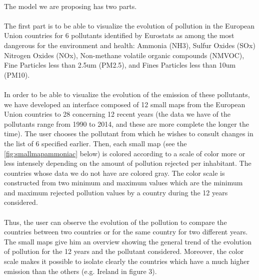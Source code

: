 \documentclass[preprint,journal]{vgtc}       %
\begin{document}
\paragraph{}
The model we are proposing has two parts.

\paragraph{}
The first part is to be able to visualize the evolution of pollution in the European Union countries for 6 pollutants identified by Eurostats as among the most dangerous for the environment and health: Ammonia (NH3), Sulfur Oxides (SOx) Nitrogen Oxides (NOx), Non-methane volatile organic compounds (NMVOC), Fine Particles less than 2.5um (PM2.5), and Fines Particles less than 10um (PM10).

\paragraph{}
In order to be able to visualize the evolution of the emission of these pollutants, we have developed an interface composed of 12 small maps from the European Union countries to 28 concerning 12 recent years (the data we have of the pollutants range from 1990 to 2014, and these are more complete the longer the time). The user chooses the pollutant from which he wishes to consult changes in the list of 6 specified earlier. Then, each small map (see the \autoref{fig:smallmapammoniac} below) is colored according to a scale of color more or less intensely depending on the amount of pollution rejected per inhabitant. The countries whose data we do not have are colored gray. The color scale is constructed from two minimum and maximum values ​​which are the minimum and maximum rejected pollution values ​​by a country during the 12 years considered.

\paragraph{}
Thus, the user can observe the evolution of the pollution to compare the countries between two countries or for the same country for two different years. The small maps give him an overview showing the general trend of the evolution of pollution for the 12 years and the pollutant considered. Moreover, the color scale makes it possible to isolate clearly the countries which have a much higher emission than the others (e.g. Ireland in figure 3).
\end{document}
